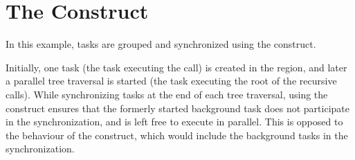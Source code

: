 \pagebreak
\section{The  Construct}
\label{sec:taskgroup}

In this example, tasks are grouped and synchronized using the  
construct.

Initially, one task (the task executing the  
call) is created in the  region, and later a parallel tree traversal 
is started (the task executing the root of the recursive  
calls). While synchronizing tasks at the end of each tree traversal, using the 
 construct ensures that the formerly started background task 
does not participate in the synchronization, and is left free to execute in parallel. 
This is opposed to the behaviour of the  construct, which would 
include the background tasks in the synchronization.



